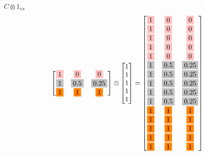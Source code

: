 \documentclass[english]{beamer}
\begin{document}
\begin{frame}{\(C \otimes 1_{vx}\)}
\footnotesize
\[ 
\begin{bmatrix}
\fcolorbox{white}{pink}{1} & \fcolorbox{white}{pink}{0} & \fcolorbox{white}{pink}{0} \\
\fcolorbox{white}{lightgray}{1} & \fcolorbox{white}{lightgray}{0.5} & \fcolorbox{white}{lightgray}{0.25} \\
\fcolorbox{white}{orange}{1} & \fcolorbox{white}{orange}{1} & \fcolorbox{white}{orange}{1}
\end{bmatrix} \otimes \begin{bmatrix}
    1 \\
    1 \\
    1 \\
    1 \\
    1
\end{bmatrix}
=\begin{bmatrix}
\fcolorbox{white}{pink}{1} & \fcolorbox{white}{pink}{0} & \fcolorbox{white}{pink}{0} \\
\fcolorbox{white}{pink}{1} & \fcolorbox{white}{pink}{0} & \fcolorbox{white}{pink}{0} \\
\fcolorbox{white}{pink}{1} & \fcolorbox{white}{pink}{0} & \fcolorbox{white}{pink}{0} \\
\fcolorbox{white}{pink}{1} & \fcolorbox{white}{pink}{0} & \fcolorbox{white}{pink}{0} \\
\fcolorbox{white}{pink}{1} & \fcolorbox{white}{pink}{0} & \fcolorbox{white}{pink}{0} \\
\fcolorbox{white}{lightgray}{1} & \fcolorbox{white}{lightgray}{0.5} & \fcolorbox{white}{lightgray}{0.25} \\
\fcolorbox{white}{lightgray}{1} & \fcolorbox{white}{lightgray}{0.5} & \fcolorbox{white}{lightgray}{0.25} \\
\fcolorbox{white}{lightgray}{1} & \fcolorbox{white}{lightgray}{0.5} & \fcolorbox{white}{lightgray}{0.25} \\
\fcolorbox{white}{lightgray}{1} & \fcolorbox{white}{lightgray}{0.5} & \fcolorbox{white}{lightgray}{0.25} \\
\fcolorbox{white}{lightgray}{1} & \fcolorbox{white}{lightgray}{0.5} & \fcolorbox{white}{lightgray}{0.25} \\
\fcolorbox{white}{orange}{1} & \fcolorbox{white}{orange}{1} & \fcolorbox{white}{orange}{1} \\
\fcolorbox{white}{orange}{1} & \fcolorbox{white}{orange}{1} & \fcolorbox{white}{orange}{1} \\
\fcolorbox{white}{orange}{1} & \fcolorbox{white}{orange}{1} & \fcolorbox{white}{orange}{1} \\
\fcolorbox{white}{orange}{1} & \fcolorbox{white}{orange}{1} & \fcolorbox{white}{orange}{1} \\
\fcolorbox{white}{orange}{1} & \fcolorbox{white}{orange}{1} & \fcolorbox{white}{orange}{1}
\end{bmatrix}
\]
\end{frame}
\end{document}
